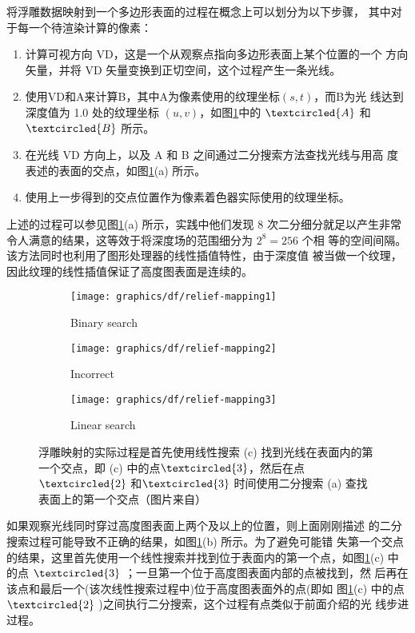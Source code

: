 将浮雕数据映射到一个多边形表面的过程在概念上可以划分为以下步骤， 其中对于每一个待渲染计算的像素：

\begin{enumerate}
	\item 计算可视方向 VD，这是一个从观察点指向多边形表面上某个位置的一个 方向矢量，并将 VD 矢量变换到正切空间，这个过程产生一条光线。
	\item 使用VD和A来计算B，其中A为像素使用的纹理坐标$(s,t)$，而B为光 线达到深度值为 1.0 处的纹理坐标 $(u, v)$，如图\ref{f:df-relief-mapping}中的 $\textcircled{A}$ 和 $\textcircled{B}$ 所示。
	\item 在光线 VD 方向上，以及 A 和 B 之间通过二分搜索方法查找光线与用高 度表述的表面的交点，如图\ref{f:df-relief-mapping}(a) 所示。
	\item 使用上一步得到的交点位置作为像素着色器实际使用的纹理坐标。
\end{enumerate}

上述的过程可以参见图\ref{f:df-relief-mapping}(a) 所示，实践中他们发现 8 次二分细分就足以产生非常令人满意的结果，这等效于将深度场的范围细分为 $2^{8} = 256$ 个相 等的空间间隔。该方法同时也利用了图形处理器的线性插值特性，由于深度值 被当做一个纹理，因此纹理的线性插值保证了高度图表面是连续的。

\begin{figure}
\begin{fullwidth}	
	\begin{subfigure}[t]{0.33\thewidth}
		\texttt{[image: graphics/df/relief-mapping1]}
		\caption{Binary search}
	\end{subfigure}
	\begin{subfigure}[t]{.33\thewidth}
		\texttt{[image: graphics/df/relief-mapping2]}
		\caption{Incorrect}
	\end{subfigure}
	\begin{subfigure}[t]{.33\thewidth}
		\texttt{[image: graphics/df/relief-mapping3]}
		\caption{Linear search}
	\end{subfigure}
	\caption{浮雕映射的实际过程是首先使用线性搜索 (c) 找到光线在表面内的第一个交点，即 (c) 中的点$\textcircled{3}$，然后在点$\textcircled{2}$ 和$\textcircled{3}$ 时间使用二分搜索 (a) 查找表面上的第一个交点（图片来自\cite{a:Real-TimeReliefMappingonArbitraryPolygonalSurfaces}）}
	\label{f:df-relief-mapping}
\end{fullwidth}
\end{figure}

如果观察光线同时穿过高度图表面上两个及以上的位置，则上面刚刚描述 的二分搜索过程可能导致不正确的结果，如图\ref{f:df-relief-mapping}(b) 所示。为了避免可能错 失第一个交点的结果，这里首先使用一个线性搜索并找到位于表面内的第一个点，如图\ref{f:df-relief-mapping}(c) 中的点 $\textcircled{3}$ ；一旦第一个位于高度图表面内部的点被找到，然 后再在该点和最后一个(该次线性搜索过程中)位于高度图表面外的点(即如 图\ref{f:df-relief-mapping}(c) 中的点 $\textcircled{2}$ )之间执行二分搜索，这个过程有点类似于前面介绍的光 线步进过程。

